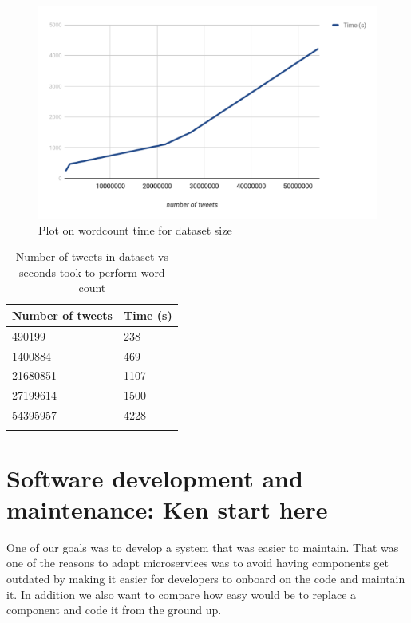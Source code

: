 \begin{figure}
\centering
\includegraphics[width=\textwidth]{Figures/wordcountplot}
\decoRule
\caption[Wordcount time plot]{Plot on wordcount time for dataset size}
\label{fig:wordcountplot}
\end{figure}


\begin{table}
\centering
\begin{tabular}{l l}
\toprule
\textbf{Number of tweets} & \textbf{Time (s)} \\
\midrule
490199 & 238 \\
1400884 & 469 \\
21680851 & 1107 \\
27199614 & 1500 \\
54395957 & 4228 \\
\bottomrule\\
\end{tabular}

\caption{Number of tweets in dataset vs seconds took to perform word count}
\label{tab:numtweets}
\end{table}


\section{Software development and maintenance: Ken start here}

One of our goals was to develop a system that was easier to maintain. That was one of the reasons to adapt microservices was to avoid having components get outdated by making it easier for developers to onboard on the code and maintain it. In addition we also want to compare how easy would be to replace a component and code it from the ground up.

